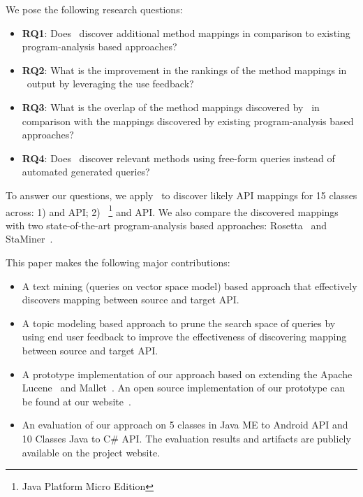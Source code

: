 We pose the following research questions:
\begin{itemize}
	
	\item\textbf{RQ1}: Does \tool\ discover additional method mappings in comparison to existing program-analysis based approaches?
	
	\item\textbf{RQ2}: What is the improvement in the rankings of the method mappings in \tool\ output by leveraging the use feedback?
	
	\item\textbf{RQ3}: What is the overlap of the method mappings discovered by \tool\ in comparison with the mappings discovered by existing program-analysis based approaches?
	
	
	\item\textbf{RQ4}: Does \tool\ discover relevant methods using free-form queries instead of automated generated queries?
	
\end{itemize}
To answer our questions, we apply \tool\ to discover likely API mappings for 15 classes across:
1)  and  API; 2) ~\footnote{Java Platform Micro Edition} and  API.
We also compare the discovered mappings with two state-of-the-art program-analysis based approaches: Rosetta~\cite{Gokhale2013ICSE} and StaMiner~\cite{nguyen2014statistical}.


This paper makes the following major contributions:
\begin{itemize}
	\item A text mining (queries on vector space model) based approach that effectively discovers mapping between source and target API.
	\item A topic modeling based approach to prune the search space of queries by using end user feedback to improve the effectiveness of discovering mapping between source and target API. 
	\item A prototype implementation of our approach based on extending the Apache Lucene~\cite{lucene} and Mallet~\cite{McCallumMALLET}. An open source implementation of our prototype can be found at our website~\cite{projectWeb}. 
	\item An evaluation of our approach on 5 classes in Java ME to Android API and 10 Classes Java to C\# API. The evaluation results and artifacts are publicly available on the project website.
\end{itemize}


